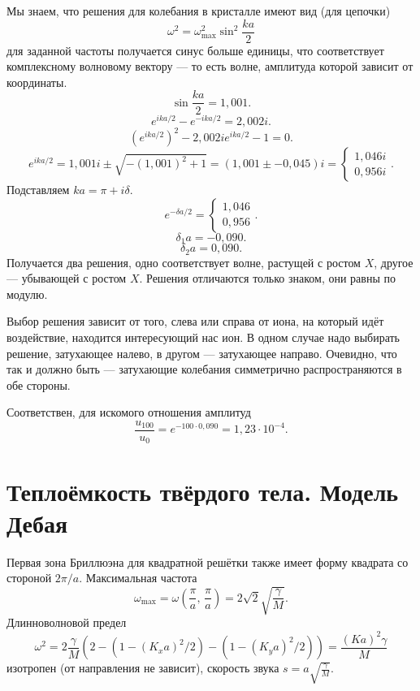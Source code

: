 \documentclass[a4paper]{article}
\begin{document}
\begin{hiProb}[2.72]
\end{hiProb}
\begin{sol}
Мы знаем, что решения для колебания в кристалле
имеют вид (для цепочки)
\[
\omega^2 =\omega^2_{\max} \sin^2 \frac{ka}{2}
\] 
для заданной частоты получается синус больше единицы, что
соответствует комплексному волновому вектору ---
то есть волне, амплитуда которой зависит от координаты.
\[
\sin \frac{ka}{2}= 1,001
.\] 
\[
e^{ika /2}-e^{-ika /2}=2,002 i
.\] 
\[
	\left( e^{ika /2} \right) ^2 -
	2,002 i e^{ika /2}-1=0
.\] 
\[
	e^{ika /2}=1,001 i \pm \sqrt{- (1,001)^2+1} 
	=\left( 1,001 \pm -0,045 \right) i=
	\begin{cases}
		1,046i\\
		0,956i
	\end{cases}
.\] 
Подставляем $ka= \pi +i \delta$.
\[
e^{-\delta a /2}= \begin{cases}
	1,046\\
	0,956
\end{cases}
.\] 
\[
\delta_1 a=-0,090
.\] 
\[
\delta_2 a=0,090
.\] 
Получается два решения, одно соответствует волне,
растущей с ростом $X$, другое --- убывающей с ростом
$X$. Решения отличаются только знаком, они
равны по модулю.

Выбор решения зависит от того, слева или справа от иона,
на который идёт воздействие, находится интересующий
нас ион. В одном случае надо выбирать решение,
затухающее налево, в другом --- затухающее направо.
Очевидно, что так и должно быть --- затухающие
колебания симметрично распространяются в обе стороны.

Соответствен, для искомого отношения амплитуд
\[
\frac{u_{100}}{u_0}= e^{-100 \cdot 0,090}=1,23
\cdot 10^{-4}
.\] 
\end{sol}
\section{Теплоёмкость твёрдого тела.
Модель Дебая}
\begin{hiProb}[2.27]	
\end{hiProb}
\begin{sol}

\end{sol}
Первая зона Бриллюэна для квадратной решётки также
имеет форму квадрата со стороной $2\pi /a$. Максимальная частота
\[
	\omega_{\max}=\omega\left( \frac{\pi}{a},\,
	\frac{\pi}{a}\right) = 2\sqrt{2} 
	\sqrt{\frac{\gamma}{M}} 
.\] 
Длинноволновой предел
\[
	\omega^2= 2 \frac{\gamma}{M} \left( 
	2- \left( 1- \left( K_x a \right) ^2 /2 \right) - \left( 1-\left( K_y a \right) ^2 /2\right) \right) 
	=\frac{\left( Ka \right) ^2 \gamma}{M}
\] 
изотропен (от направления не зависит), скорость
звука $\displaystyle  s= a \sqrt{\frac{\gamma}{M}} $.
\end{document}
